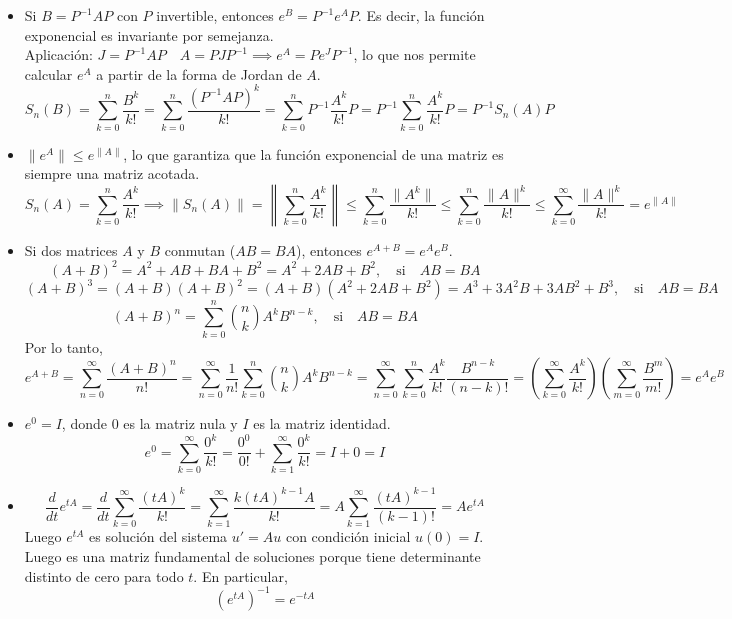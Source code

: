 \begin{itemize}
    \item Si $B = P^{-1} A P$ con $P$ invertible, entonces $e^B = P^{-1} e^A P$. Es decir, la función exponencial es invariante por semejanza. \\
    Aplicación: $J = P^{-1} A P \quad A = P J P^{-1} \implies e^A = P e^J P^{-1}$, lo que nos permite calcular $e^A$ a partir de la forma de Jordan de $A$.
    \[
        S_n(B) = \sum_{k=0}^n \frac{B^k}{k!} = \sum_{k=0}^n \frac{(P^{-1} A P)^k}{k!} = \sum_{k=0}^n P^{-1} \frac{A^k}{k!} P = P^{-1} \sum_{k=0}^n \frac{A^k}{k!} P = P^{-1} S_n(A) P
    \]
    \item $\|e^A\| \leq e^{\|A\|}$, lo que garantiza que la función exponencial de una matriz es siempre una matriz acotada.
    \[
        S_n(A) = \sum_{k=0}^n \frac{A^k}{k!} \implies \|S_n(A)\| = \left\| \sum_{k=0}^n \frac{A^k}{k!} \right\| \leq \sum_{k=0}^n \frac{\|A^k\|}{k!} \leq \sum_{k=0}^n \frac{\|A\|^k}{k!} \leq \sum_{k=0}^\infty \frac{\|A\|^k}{k!} = e^{\|A\|}
    \]
    \item Si dos matrices $A$ y $B$ conmutan ($AB = BA$), entonces $e^{A+B} = e^A e^B$. \\
    \[
        (A+B)^2 = A^2 + AB + BA + B^2 = A^2 + 2AB + B^2, \quad \text{si} \quad AB = BA
    \]
    \[
        (A+B)^3 = (A+B)(A+B)^2 = (A+B)(A^2 + 2AB + B^2) = A^3 + 3A^2B + 3AB^2 + B^3, \quad \text{si} \quad AB = BA
    \]
    \[
        (A+B)^n = \sum_{k=0}^n \binom{n}{k} A^k B^{n-k}, \quad \text{si} \quad AB = BA
    \]
    Por lo tanto,
    \[
        e^{A+B} = \sum_{n=0}^\infty \frac{(A+B)^n}{n!} = \sum_{n=0}^\infty \frac{1}{n!} \sum_{k=0}^n \binom{n}{k} A^k B^{n-k} = \sum_{n=0}^\infty \sum_{k=0}^n \frac{A^k}{k!} \frac{B^{n-k}}{(n-k)!} = \left( \sum_{k=0}^\infty \frac{A^k}{k!} \right) \left( \sum_{m=0}^\infty \frac{B^m}{m!} \right) = e^A e^B
    \]
    \item $e^0 = I$, donde $0$ es la matriz nula y $I$ es la matriz identidad. \\
    \[
        e^0 = \sum_{k=0}^\infty \frac{0^k}{k!} = \frac{0^0}{0!} + \sum_{k=1}^\infty \frac{0^k}{k!} = I + 0 = I
    \]
    \item  
    \[
        \frac{d}{dt} e^{tA} = \frac{d}{dt} \sum_{k=0}^\infty \frac{(tA)^k}{k!} = \sum_{k=1}^\infty \frac{k(tA)^{k-1} A}{k!} = A \sum_{k=1}^\infty \frac{(tA)^{k-1}}{(k-1)!} = A e^{tA}
    \]
    Luego $e^{tA}$ es solución del sistema $u' = A u$ con condición inicial $u(0) = I$. Luego es una matriz fundamental de soluciones porque tiene determinante distinto de cero para todo $t$. En particular, 
    \[
        (e^{tA})^{-1} = e^{-tA}
    \]
\end{itemize}

